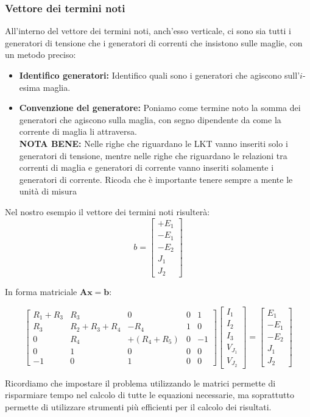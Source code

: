 \subsubsection*{Vettore dei termini noti}

All'interno del vettore dei termini noti, anch'esso verticale, ci sono sia tutti i generatori di tensione che i generatori di correnti che insistono sulle maglie, con un metodo preciso:
\begin{itemize}
    \item \textbf{Identifico generatori:} Identifico quali sono i generatori che agiscono sull'$i$-esima maglia.
    \item \textbf{Convenzione del generatore:} Poniamo come termine noto la somma dei generatori che agiscono sulla maglia, con segno dipendente da come la corrente di maglia li attraversa.\\ \textbf{NOTA BENE:} Nelle righe che riguardano le LKT vanno inseriti solo i generatori di tensione, mentre nelle righe che riguardano le relazioni tra correnti di maglia e generatori di corrente vanno inseriti solamente i generatori di corrente. Ricoda che è importante tenere sempre a mente le unità di misura
\end{itemize}

Nel nostro esempio il vettore dei termini noti risulterà:
\begin{equation}
    b =
    \begin{bmatrix}
        + E_1 \\
        - E_1 \\
        - E_2 \\
        J_1   \\
        J_2
    \end{bmatrix}
\end{equation}

In forma matriciale \(\mathbf{A} \mathbf{x} = \mathbf{b}\):

\begin{equation}
    \begin{bmatrix}
        R_1+R_3 & R_3         & 0          & 0 & 1  \\
        R_3     & R_2+R_3+R_4 & -R_4       & 1 & 0  \\
        0       & R_4         & +(R_4+R_5) & 0 & -1 \\
        0       & 1           & 0          & 0 & 0  \\
        - 1     & 0           & 1          & 0 & 0
    \end{bmatrix}
    \begin{bmatrix}
        I_1 \\ I_2 \\ I_3 \\ V_{J_1} \\ V_{J_2}
    \end{bmatrix}
    =
    \begin{bmatrix}
        E_1 \\ - E_1 \\ - E_2 \\ J_1 \\ J_2
    \end{bmatrix}
\end{equation}

Ricordiamo che impostare il problema utilizzando le matrici permette di risparmiare tempo nel calcolo di tutte le equazioni necessarie, ma soprattutto permette di utilizzare strumenti più efficienti per il calcolo dei risultati.

